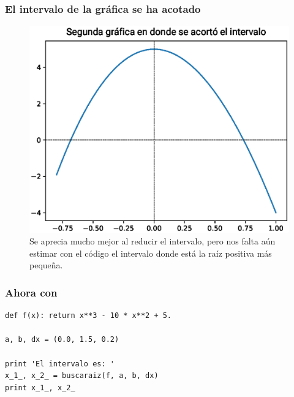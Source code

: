 \begin{frame}
\frametitle{El intervalo de la gráfica se ha acotado}
\begin{figure}
	\centering
	\includegraphics[scale=0.5]{Imagenes/aprox_sucesivas_02.eps}
	\caption{Se aprecia mucho mejor al reducir el intervalo, pero nos falta aún estimar con el código el intervalo donde está la raíz positiva más pequeña.} 
\end{figure}
\end{frame}
\begin{frame}[fragile]
\frametitle{Ahora con \python}
\begin{lstlisting}[caption=Solución con python, style=FormattedNumber, basicstyle=\linespread{1.1}\ttfamily=\small, columns=fullflexible]
def f(x): return x**3 - 10 * x**2 + 5.

a, b, dx = (0.0, 1.5, 0.2)

print 'El intervalo es: '
x_1_, x_2_ = buscaraiz(f, a, b, dx)
print x_1_, x_2_
\end{lstlisting}
\end{frame}
